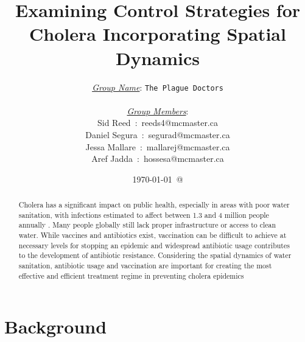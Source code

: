 \documentclass[12pt]{article}\usepackage[]{graphicx}\usepackage[]{color}
\begin{document}
\title{Examining Control Strategies for Cholera Incorporating Spatial Dynamics}
\author{
\underline{\emph{Group Name}}: \texttt{{\color{blue}The Plague Doctors}}\\\\
\underline{\emph{Group Members}}:\\
         Sid Reed\ :\ {\color{blue}reeds4@mcmaster.ca}\\
         Daniel Segura\ :\ {\color{blue}segurad@mcmaster.ca}\\
         Jessa Mallare\ :\ {\color{blue}mallarej@mcmaster.ca}\\
         Aref Jadda\ :\ {\color{blue}hossesa@mcmaster.ca}\\
}
\date{\today\ @ \thistime}
\maketitle

\begin{abstract}
    Cholera has a significant impact on public health, especially in areas with poor water sanitation, with infections estimated to affect between 1.3 and 4 million people annually \citep{link18}.
    Many people globally still lack proper infrastructure or access to clean water\citep{link19}.
    While vaccines and antibiotics exist, vaccination can be difficult to achieve at necessary levels for stopping an epidemic and widespread antibiotic usage contributes to the development of antibiotic resistance.
    Considering the spatial dynamics of water sanitation, antibiotic usage and vaccination are important for creating the most effective and efficient treatment regime in preventing cholera epidemics
\end{abstract}

\clearpage
\tableofcontents
\clearpage

\section{Background}
\end{document}

